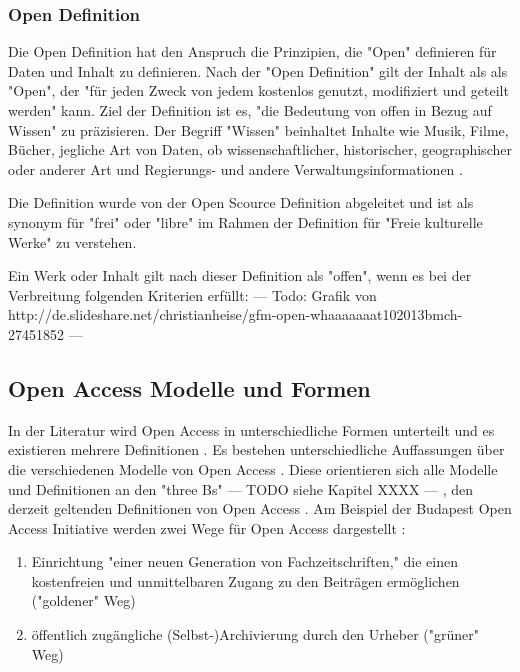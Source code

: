 \subsubsection{Open Definition}

Die Open Definition hat den Anspruch die Prinzipien, die "Open" definieren für Daten und Inhalt zu definieren. Nach der "Open Definition" gilt der Inhalt als als "Open", der "für jeden Zweck von jedem kostenlos genutzt, modifiziert und geteilt werden" \cite{open_definition} kann. Ziel der Definition ist es, "die Bedeutung von offen in Bezug auf Wissen" zu präzisieren. Der Begriff "Wissen" beinhaltet Inhalte wie Musik, Filme, Bücher, jegliche Art von Daten, ob wissenschaftlicher, historischer, geographischer oder anderer Art und Regierungs- und andere Verwaltungsinformationen \cite{open_definition}.

Die Definition wurde von der Open Scource Definition abgeleitet und ist als synonym für "frei" oder "libre" im Rahmen der Definition für "Freie kulturelle Werke" zu verstehen.

Ein Werk oder Inhalt gilt nach dieser Definition als "offen", wenn es bei der Verbreitung folgenden Kriterien erfüllt:
--- Todo: Grafik von http://de.slideshare.net/christianheise/gfm-open-whaaaaaaat102013bmch-27451852 ---

\subsection{Open Access Modelle und Formen}

In der Literatur wird Open Access in unterschiedliche Formen unterteilt und es existieren mehrere Definitionen \cite{CREATe_2014} \cite{albert_2006_open_implications}. Es bestehen unterschiedliche Auffassungen über die verschiedenen Modelle von Open Access \cite{CREATe_2014} \cite{cite:22b} \cite{lewis_2012_inevitability}. Diese orientieren sich alle Modelle und Definitionen an den "three Bs" --- TODO siehe Kapitel XXXX --- , den derzeit geltenden Definitionen von Open Access \cite{Adema_2014_open_access}. Am Beispiel der Budapest Open Access Initiative werden zwei Wege für Open Access dargestellt \cite{albert_2006_open_implications}: 
\begin{enumerate}
\item Einrichtung "einer neuen Generation von Fachzeitschriften," die einen kostenfreien und unmittelbaren Zugang zu den Beiträgen ermöglichen ("goldener" Weg)
\item öffentlich zugängliche (Selbst-)Archivierung durch den Urheber ("grüner" Weg)
\end{enumerate}

